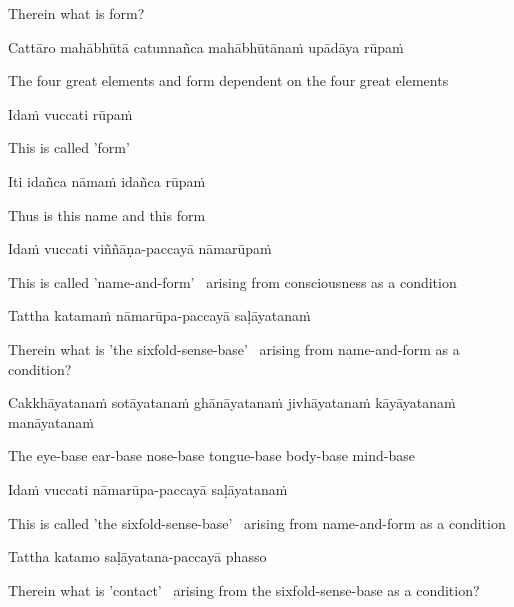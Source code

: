 \begin{english}
  Therein what is form?
\end{english}

Cattāro mahābhūtā catunnañca mahābhūtānaṁ upādāya rūpaṁ

\begin{english}
  The four great elements and form dependent on the four great elements
\end{english}

Idaṁ vuccati rūpaṁ

\begin{english}
  This is called 'form'
\end{english}

Iti idañca nāmaṁ idañca rūpaṁ

\begin{english}
  Thus is this name and this form
\end{english}

Idaṁ vuccati viññāṇa-paccayā nāmarūpaṁ

\begin{english}
  This is called 'name-and-form' \breathmark\ arising from consciousness as a condition
\end{english}

Tattha katamaṁ nāmarūpa-paccayā saḷāyatanaṁ

\begin{english}
  Therein what is 'the sixfold-sense-base' \breathmark\ arising from name-and-form as a condition?
\end{english}

Cakkhāyatanaṁ sotāyatanaṁ ghānāyatanaṁ jivhāyatanaṁ kāyāyatanaṁ manāyatanaṁ

\begin{english}
  The eye-base ear-base nose-base tongue-base body-base mind-base
\end{english}

Idaṁ vuccati nāmarūpa-paccayā saḷāyatanaṁ

\begin{english}
  This is called 'the sixfold-sense-base' \breathmark\ arising from name-and-form as a condition
\end{english}

Tattha katamo saḷāyatana-paccayā phasso

\begin{english}
  Therein what is 'contact' \breathmark\ arising from the sixfold-sense-base as a condition?
\end{english}

